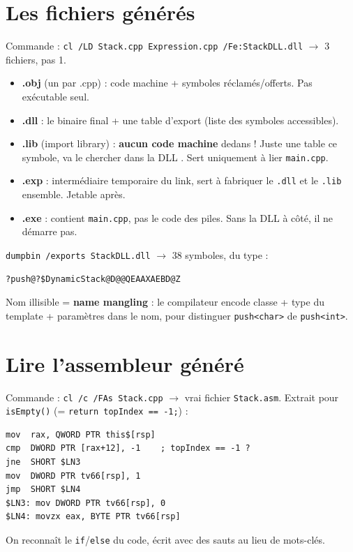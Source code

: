 \documentclass[11pt,a4paper]{article}
\newcommand{\pt}[1]{\textbf{\color{bleu}#1}}
\begin{document}
\section{Les fichiers générés}

Commande : \texttt{cl /LD Stack.cpp Expression.cpp /Fe:StackDLL.dll} $\to$ 3 fichiers, pas 1.

\begin{itemize}
\item \pt{.obj} (un par .cpp) : code machine + symboles réclamés/offerts. Pas exécutable seul.
\item \pt{.dll} : le binaire final + une table d'export (liste des symboles accessibles).
\item \pt{.lib} (import library) : \textbf{aucun code machine} dedans ! Juste une table \og ce symbole, va le chercher dans la DLL \fg. Sert uniquement à lier \texttt{main.cpp}.
\item \pt{.exp} : intermédiaire temporaire du link, sert à fabriquer le \texttt{.dll} et le \texttt{.lib} ensemble. Jetable après.
\item \pt{.exe} : contient \texttt{main.cpp}, pas le code des piles. Sans la DLL à côté, il ne démarre pas.
\end{itemize}

\texttt{dumpbin /exports StackDLL.dll} $\to$ 38 symboles, du type :
\begin{lstlisting}
?push@?$DynamicStack@D@@QEAAXAEBD@Z
\end{lstlisting}
Nom illisible = \pt{name mangling} : le compilateur encode classe + type du template + paramètres dans le nom, pour distinguer \texttt{push<char>} de \texttt{push<int>}.

\section{Lire l'assembleur généré}

Commande : \texttt{cl /c /FAs Stack.cpp} $\to$ vrai fichier \texttt{Stack.asm}. Extrait pour \texttt{isEmpty()} (= \texttt{return topIndex == -1;}) :

\begin{lstlisting}
mov  rax, QWORD PTR this$[rsp]
cmp  DWORD PTR [rax+12], -1    ; topIndex == -1 ?
jne  SHORT $LN3
mov  DWORD PTR tv66[rsp], 1
jmp  SHORT $LN4
$LN3: mov DWORD PTR tv66[rsp], 0
$LN4: movzx eax, BYTE PTR tv66[rsp]
\end{lstlisting}

On reconnaît le \texttt{if}/\texttt{else} du code, écrit avec des sauts au lieu de mots-clés.
\end{document}
